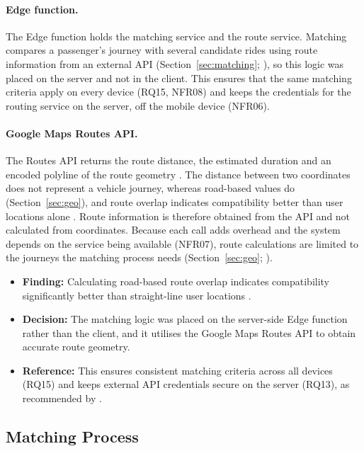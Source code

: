 \paragraph{Edge function.} The Edge function holds the matching service and the route service. Matching compares a passenger's journey with several candidate rides using route information from an external API (Section~\ref{sec:matching}; \citealp{google2026a}), so this logic was placed on the server and not in the client. This ensures that the same matching criteria apply on every device (RQ15, NFR08) and keeps the credentials for the routing service on the server, off the mobile device (NFR06).

\paragraph{Google Maps Routes API.} The Routes API returns the route distance, the estimated duration and an encoded polyline of the route geometry \citep{google2026a}. The distance between two coordinates does not represent a vehicle journey, whereas road-based values do (Section~\ref{sec:geo}), and route overlap indicates compatibility better than user locations alone \citep{hong2017}. Route information is therefore obtained from the API and not calculated from coordinates. Because each call adds overhead and the system depends on the service being available (NFR07), route calculations are limited to the journeys the matching process needs (Section~\ref{sec:geo}; \citealp{google2026b}).

\begin{itemize}
  \item \textbf{Finding:} Calculating road-based route overlap indicates compatibility significantly better than straight-line user locations \citep{hong2017}.
  \item \textbf{Decision:} The matching logic was placed on the server-side Edge function rather than the client, and it utilises the Google Maps Routes API to obtain accurate route geometry.
  \item \textbf{Reference:} This ensures consistent matching criteria across all devices (RQ15) and keeps external API credentials secure on the server (RQ13), as recommended by \citet{google2026a}.
\end{itemize}

\subsection{Matching Process}

